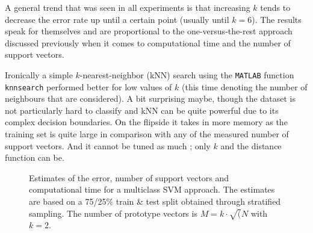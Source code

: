 \par A general trend that was seen in all experiments is that increasing $k$ tends to decrease the error rate up until a certain point (usually until $k=6$). The results speak for themselves and are proportional to the one-versus-the-rest approach discussed previously when it comes to computational time and the number of support vectors.

\par Ironically a simple $k$-nearest-neighbor (kNN) search using the \texttt{MATLAB} function \texttt{knnsearch} performed better for low values of $k$ (this time denoting the number of neighbours that are considered). A bit surprising maybe, though the dataset is not particularly hard to classify and kNN can be quite powerful due to its complex decision boundaries. On the flipside it takes in more memory as the training set is quite large in comparison with any of the measured number of support vectors. And it cannot be tuned as much ; only $k$ and the distance function can be.

\begin{figure}[!htb]
\centering
\begin{minipage}{\textwidth}
        \centering
        \hfil
	\hfil
	\hfil
\end{minipage}
\caption{Estimates of the error, number of support vectors and computational time for a multiclass SVM approach. The estimates are based on a 75/25\% train \& test split obtained through stratified sampling. The number of prototype vectors is $M=k\cdot\sqrt({N}$ with $k=2$.}
\label{shuttlemultiestimates}
\end{figure}

